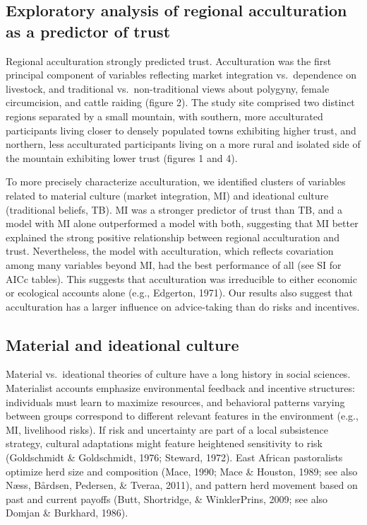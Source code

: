\documentclass[
  11pt,
]{article}
\begin{document}
\hypertarget{exploratory-analysis-of-regional-acculturation-as-a-predictor-of-trust}{%
\subsection{Exploratory analysis of regional acculturation as a
predictor of
trust}\label{exploratory-analysis-of-regional-acculturation-as-a-predictor-of-trust}}

Regional acculturation strongly predicted trust. Acculturation was the
first principal component of variables reflecting market integration
vs.~dependence on livestock, and traditional vs.~non-traditional views
about polygyny, female circumcision, and cattle raiding (figure 2). The
study site comprised two distinct regions separated by a small mountain,
with southern, more acculturated participants living closer to densely
populated towns exhibiting higher trust, and northern, less acculturated
participants living on a more rural and isolated side of the mountain
exhibiting lower trust (figures 1 and 4).

To more precisely characterize acculturation, we identified clusters of
variables related to material culture (market integration, MI) and
ideational culture (traditional beliefs, TB). MI was a stronger
predictor of trust than TB, and a model with MI alone outperformed a
model with both, suggesting that MI better explained the strong positive
relationship between regional acculturation and trust. Nevertheless, the
model with acculturation, which reflects covariation among many
variables beyond MI, had the best performance of all (see SI for AICc
tables). This suggests that acculturation was irreducible to either
economic or ecological accounts alone (e.g., Edgerton, 1971). Our
results also suggest that acculturation has a larger influence on
advice-taking than do risks and incentives.

\hypertarget{material-and-ideational-culture}{%
\subsection{Material and ideational
culture}\label{material-and-ideational-culture}}

Material vs.~ideational theories of culture have a long history in
social sciences. Materialist accounts emphasize environmental feedback
and incentive structures: individuals must learn to maximize resources,
and behavioral patterns varying between groups correspond to different
relevant features in the environment (e.g., MI, livelihood risks). If
risk and uncertainty are part of a local subsistence strategy, cultural
adaptations might feature heightened sensitivity to risk (Goldschmidt \&
Goldschmidt, 1976; Steward, 1972). East African pastoralists optimize
herd size and composition (Mace, 1990; Mace \& Houston, 1989; see also
Næss, Bårdsen, Pedersen, \& Tveraa, 2011), and pattern herd movement
based on past and current payoffs (Butt, Shortridge, \& WinklerPrins,
2009; see also Domjan \& Burkhard, 1986).
\end{document}
